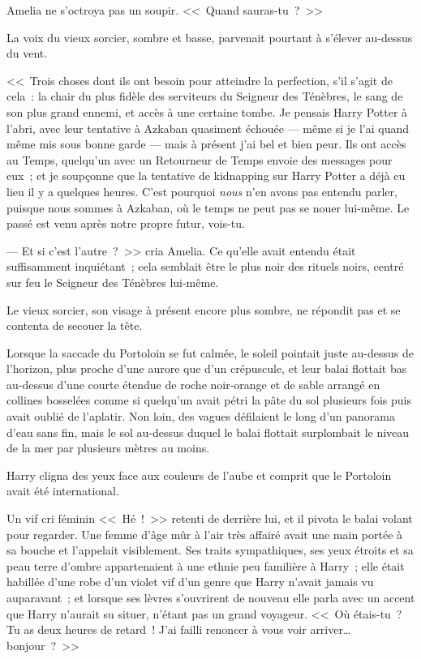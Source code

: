 Amelia ne s'octroya pas un soupir. <<~Quand sauras-tu~?~>>

La voix du vieux sorcier, sombre et basse, parvenait pourtant à s'élever au-dessus du vent.

<<~Trois choses dont ils ont besoin pour atteindre la perfection, s'il s'agit de cela~: la chair du plus fidèle des serviteurs du Seigneur des Ténèbres, le sang de son plus grand ennemi, et accès à une certaine tombe. Je pensais Harry Potter à l'abri, avec leur tentative à Azkaban quasiment échouée — même si je l'ai quand même mis sous bonne garde — mais à présent j'ai bel et bien peur. Ils ont accès au Temps, quelqu'un avec un Retourneur de Temps envoie des messages pour eux~; et je soupçonne que la tentative de kidnapping sur Harry Potter a déjà eu lieu il y a quelques heures. C'est pourquoi \emph{nous} n'en avons pas entendu parler, puisque nous sommes à Azkaban, où le temps ne peut pas se nouer lui-même. Le passé est venu après notre propre futur, vois-tu.

--- Et si c'est l'autre~?~>> cria Amelia. Ce qu'elle avait entendu était suffisamment inquiétant~; cela semblait être le plus noir des rituels noirs, centré sur feu le Seigneur des Ténèbres lui-même.

Le vieux sorcier, son visage à présent encore plus sombre, ne répondit pas et se contenta de secouer la tête.

\later

Lorsque la saccade du Portoloin se fut calmée, le soleil pointait juste au-dessus de l'horizon, plus proche d'une aurore que d'un crépuscule, et leur balai flottait bas au-dessus d'une courte étendue de roche noir-orange et de sable arrangé en collines bosselées comme si quelqu'un avait pétri la pâte du sol plusieurs fois puis avait oublié de l'aplatir. Non loin, des vagues défilaient le long d'un panorama d'eau sans fin, mais le sol au-dessus duquel le balai flottait surplombait le niveau de la mer par plusieurs mètres au moins.

Harry cligna des yeux face aux couleurs de l'aube et comprit que le Portoloin avait été international.

Un vif cri féminin <<~Hé~!~>> retenti de derrière lui, et il pivota le balai volant pour regarder. Une femme d'âge mûr à l'air très affairé avait une main portée à sa bouche et l'appelait visiblement. Ses traits sympathiques, ses yeux étroits et sa peau terre d'ombre appartenaient à une ethnie peu familière à Harry~; elle était habillée d'une robe d'un violet vif d'un genre que Harry n'avait jamais vu auparavant~; et lorsque ses lèvres s'ouvrirent de nouveau elle parla avec un accent que Harry n'aurait su situer, n'étant pas un grand voyageur. <<~Où étais-tu~? Tu as deux heures de retard~! J'ai failli renoncer à vous voir arriver… bonjour~?~>>

